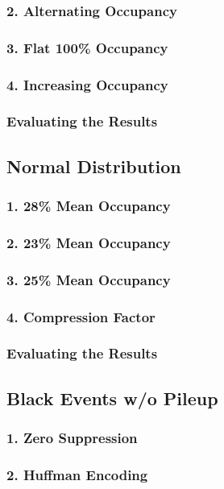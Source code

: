 \documentclass[a4paper, 12pt]{report}
\begin{document}
\subsubsection{2. Alternating Occupancy}
\subsubsection{3. Flat 100\% Occupancy}
\subsubsection{4. Increasing Occupancy}
\subsubsection{Evaluating the Results}

\subsection{Normal Distribution}
\subsubsection{1. 28\% Mean Occupancy}
\subsubsection{2. 23\% Mean Occupancy}
\subsubsection{3. 25\% Mean Occupancy}
\subsubsection{4. Compression Factor}
\subsubsection{Evaluating the Results}

\subsection{Black Events w/o Pileup}
\subsubsection{1. Zero Suppression}
\subsubsection{2. Huffman Encoding}
\end{document}
